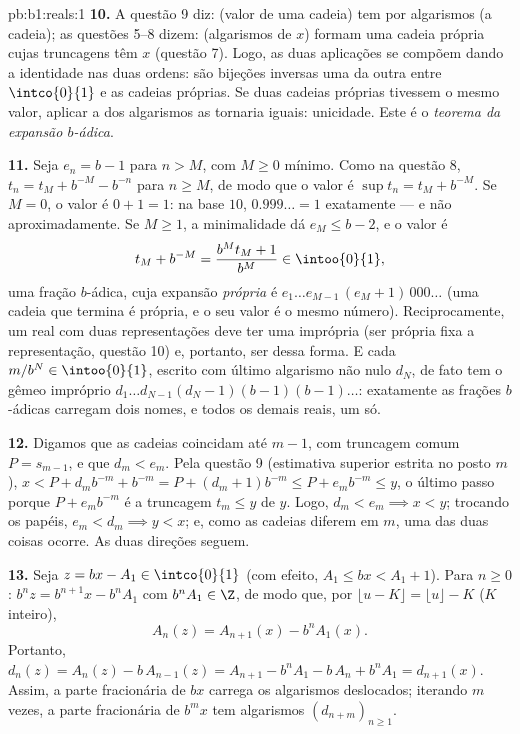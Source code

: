 \begin{solution}{pb:b1:reals:1}
\textbf{10.} A questão 9 diz: (valor de uma cadeia) tem por algarismos
(a cadeia); as questões 5--8 dizem: (algarismos de $x$) formam uma
cadeia própria cujas truncagens têm  $x$ (questão 7). Logo, as
duas aplicações se compõem dando a identidade nas duas ordens: são
bijeções inversas uma da outra entre $\intco{0}{1}$ e as cadeias próprias.
Se duas cadeias próprias tivessem o mesmo valor, aplicar a 
dos algarismos as tornaria iguais: unicidade. Este é o \emph{teorema da
expansão $b$-ádica}.

\textbf{11.} Seja $e_n = b - 1$ para $n > M$, com $M \geq 0$ mínimo.
Como na questão 8, $t_n = t_M + b^{-M} - b^{-n}$ para $n \geq M$,
de modo que o valor é $\sup t_n = t_M + b^{-M}$. Se $M = 0$, o valor
é $0 + 1 = 1$: na base $10$, $0.999\dots = 1$ exatamente --- e não
aproximadamente. Se $M \geq 1$, a minimalidade dá $e_M \leq b - 2$,
e o valor é
\[
t_M + b^{-M} = \frac{b^M t_M + 1}{b^M} \in \intoo{0}{1},
\]
uma fração $b$-ádica, cuja expansão \emph{própria} é $e_1 \dots
e_{M-1}\,(e_M + 1)\,000\dots$ (uma cadeia que termina é própria,
e o seu valor é o mesmo número). Reciprocamente, um real com duas
representações deve ter uma imprópria (ser própria fixa a
representação, questão 10) e, portanto, ser dessa forma. E cada
$m/b^N \in \intoo{0}{1}$, escrito com último algarismo não nulo $d_N$,
de fato tem o gêmeo impróprio $d_1 \dots d_{N-1}(d_N -
1)(b-1)(b-1)\dots$: exatamente as frações $b$-ádicas carregam dois
nomes, e todos os demais reais, um só.

\textbf{12.} Digamos que as cadeias coincidam até $m - 1$, com truncagem
comum $P = s_{m-1}$, e que $d_m < e_m$. Pela questão 9 (estimativa
superior estrita no posto $m$), $x < P + d_m b^{-m} + b^{-m} = P +
(d_m + 1)b^{-m} \leq P + e_m b^{-m} \leq y$, o último passo
porque $P + e_m b^{-m}$ é a truncagem $t_m \leq y$ de $y$. Logo,
$d_m < e_m \implies x < y$; trocando os papéis, $e_m < d_m \implies
y < x$; e, como as cadeias diferem em $m$, uma das duas
coisas ocorre. As duas direções seguem.

\textbf{13.} Seja $z = bx - A_1 \in \intco{0}{1}$ (com efeito, $A_1
\leq bx < A_1 + 1$). Para $n \geq 0$: $b^n z = b^{n+1} x - b^n
A_1$ com $b^n A_1 \in \Z$, de modo que, por $\lfloor u - K \rfloor =
\lfloor u \rfloor - K$ ($K$ inteiro),
\[
A_n(z) = A_{n+1}(x) - b^n A_1(x) .
\]
Portanto, $d_n(z) = A_n(z) - b\,A_{n-1}(z) = A_{n+1} - b^n A_1 -
b\,A_n + b^n A_1 = d_{n+1}(x)$. Assim, a parte fracionária de $bx$
carrega os algarismos deslocados; iterando $m$ vezes, a parte
fracionária de $b^m x$ tem algarismos $(d_{n+m})_{n \geq 1}$.


\end{solution}
